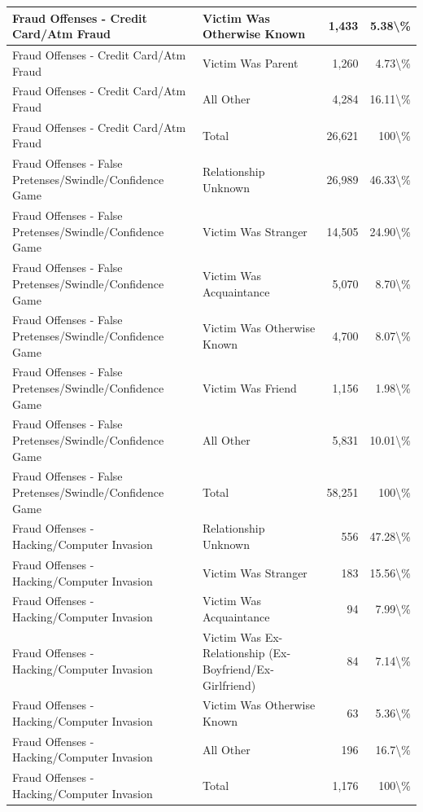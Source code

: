 \documentclass[
]{krantz}
\begin{document}
\begin{longtable}[t]{l|l|r|r}
\hline
Fraud Offenses - Credit Card/Atm Fraud & Victim Was Otherwise Known & 1,433 & 5.38\textbackslash{}\%\\
\hline
Fraud Offenses - Credit Card/Atm Fraud & Victim Was Parent & 1,260 & 4.73\textbackslash{}\%\\
\hline
Fraud Offenses - Credit Card/Atm Fraud & All Other & 4,284 & 16.11\textbackslash{}\%\\
\hline
Fraud Offenses - Credit Card/Atm Fraud & Total & 26,621 & 100\textbackslash{}\%\\
\hline
Fraud Offenses - False Pretenses/Swindle/Confidence Game & Relationship Unknown & 26,989 & 46.33\textbackslash{}\%\\
\hline
Fraud Offenses - False Pretenses/Swindle/Confidence Game & Victim Was Stranger & 14,505 & 24.90\textbackslash{}\%\\
\hline
Fraud Offenses - False Pretenses/Swindle/Confidence Game & Victim Was Acquaintance & 5,070 & 8.70\textbackslash{}\%\\
\hline
Fraud Offenses - False Pretenses/Swindle/Confidence Game & Victim Was Otherwise Known & 4,700 & 8.07\textbackslash{}\%\\
\hline
Fraud Offenses - False Pretenses/Swindle/Confidence Game & Victim Was Friend & 1,156 & 1.98\textbackslash{}\%\\
\hline
Fraud Offenses - False Pretenses/Swindle/Confidence Game & All Other & 5,831 & 10.01\textbackslash{}\%\\
\hline
Fraud Offenses - False Pretenses/Swindle/Confidence Game & Total & 58,251 & 100\textbackslash{}\%\\
\hline
Fraud Offenses - Hacking/Computer Invasion & Relationship Unknown & 556 & 47.28\textbackslash{}\%\\
\hline
Fraud Offenses - Hacking/Computer Invasion & Victim Was Stranger & 183 & 15.56\textbackslash{}\%\\
\hline
Fraud Offenses - Hacking/Computer Invasion & Victim Was Acquaintance & 94 & 7.99\textbackslash{}\%\\
\hline
Fraud Offenses - Hacking/Computer Invasion & Victim Was Ex-Relationship (Ex-Boyfriend/Ex-Girlfriend) & 84 & 7.14\textbackslash{}\%\\
\hline
Fraud Offenses - Hacking/Computer Invasion & Victim Was Otherwise Known & 63 & 5.36\textbackslash{}\%\\
\hline
Fraud Offenses - Hacking/Computer Invasion & All Other & 196 & 16.7\textbackslash{}\%\\
\hline
Fraud Offenses - Hacking/Computer Invasion & Total & 1,176 & 100\textbackslash{}\%\\

\end{longtable}
\end{document}
